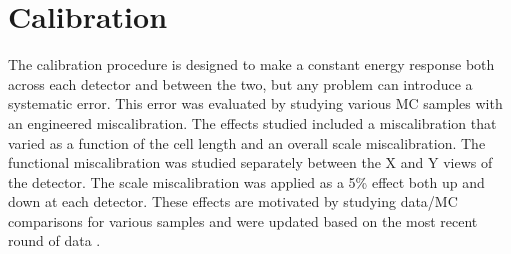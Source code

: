 \section{Calibration}

The calibration procedure is designed to make a constant energy response both across each detector and between the two, but any problem can introduce a systematic error. This error was evaluated by studying various MC samples with an engineered miscalibration. The effects studied included a miscalibration that varied as a function of the cell length and an overall scale miscalibration. The functional miscalibration was studied separately between the X and Y views of the detector. The scale miscalibration was applied as a 5\% effect both up and down at each detector. These effects are motivated by studying data/MC comparisons for various samples \cite{ref:TNCalib, ref:CalibMESA, ref:CalibPi0SA} and were updated based on the most recent round of data \cite{ref:CalibSA}.

